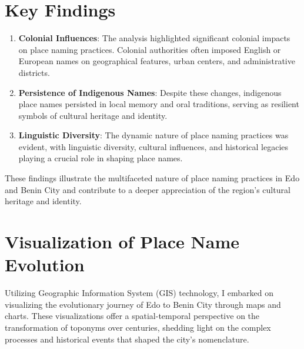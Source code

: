 \section{Key Findings}
\begin{enumerate}
    \item \textbf{Colonial Influences}: The analysis highlighted significant colonial impacts on place naming practices. Colonial authorities often imposed English or European names on geographical features, urban centers, and administrative districts.
    \item \textbf{Persistence of Indigenous Names}: Despite these changes, indigenous place names persisted in local memory and oral traditions, serving as resilient symbols of cultural heritage and identity.
    \item \textbf{Linguistic Diversity}: The dynamic nature of place naming practices was evident, with linguistic diversity, cultural influences, and historical legacies playing a crucial role in shaping place names.
\end{enumerate}

These findings illustrate the multifaceted nature of place naming practices in Edo and Benin City and contribute to a deeper appreciation of the region's cultural heritage and identity.

\section{Visualization of Place Name Evolution}

Utilizing Geographic Information System (GIS) technology, I embarked on visualizing the evolutionary journey of Edo to Benin City through maps and charts. These visualizations offer a spatial-temporal perspective on the transformation of toponyms over centuries, shedding light on the complex processes and historical events that shaped the city's nomenclature.


